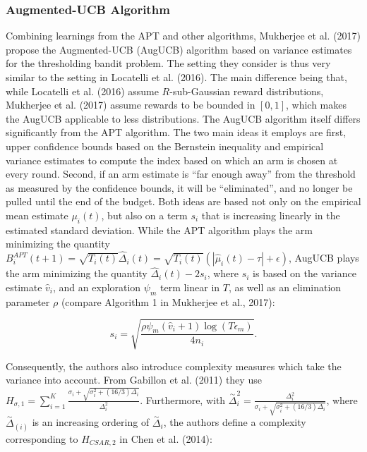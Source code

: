 \documentclass[11pt,]{article}
\begin{document}
\subsubsection{\texorpdfstring{Augmented-UCB Algorithm
\label{sec:AugUCBAlgorithm}}{Augmented-UCB Algorithm }}\label{augmented-ucb-algorithm}

Combining learnings from the APT and other algorithms, Mukherjee et al.
(2017) propose the Augmented-UCB (AugUCB) algorithm based on variance
estimates for the thresholding bandit problem. The setting they consider
is thus very similar to the setting in Locatelli et al. (2016). The main
difference being that, while Locatelli et al. (2016) assume
\(R\)-sub-Gaussian reward distributions, Mukherjee et al. (2017) assume
rewards to be bounded in \([0,1]\), which makes the AugUCB applicable to
less distributions. The AugUCB algorithm itself differs significantly
from the APT algorithm. The two main ideas it employs are first, upper
confidence bounds based on the Bernstein inequality and empirical
variance estimates to compute the index based on which an arm is chosen
at every round. Second, if an arm estimate is ``far enough away'' from
the threshold as measured by the confidence bounds, it will be
``eliminated'', and no longer be pulled until the end of the budget.
Both ideas are based not only on the empirical mean estimate
\(\mu_i(t)\), but also on a term \(s_i\) that is increasing linearly in
the estimated standard deviation. While the APT algorithm plays the arm
minimizing the quantity
\(B_i^{APT}(t+1) = \sqrt{T_i(t)} \hat{\Delta}_i(t) = \sqrt{T_i(t)} (|\hat{\mu}_i(t) - \tau| + \epsilon)\),
AugUCB plays the arm minimizing the quantity
\(\hat{\Delta}_i(t) - 2s_i\), where \(s_i\) is based on the variance
estimate \(\hat{v}_i\), and an exploration \(\psi_m\) term linear in
\(T\), as well as an elimination parameter \(\rho\) (compare Algorithm 1
in Mukherjee et al., 2017):

\begin{equation*}
s_i = \sqrt{\frac{\rho \psi_m (\hat{v}_i + 1) \log(T \epsilon_m)}{4n_i}}.
\end{equation*}

Consequently, the authors also introduce complexity measures which take
the variance into account. From Gabillon et al. (2011) they use
\(H_{\sigma, 1}= \sum_{i=1}^K \frac{\sigma_i + \sqrt{\sigma_i^2 + (16/3)\Delta_i}}{\Delta_i^2}\).
Furthermore, with
\(\stackrel{\sim}{\Delta}_i^2 = \frac{\Delta_i^2}{\sigma_i + \sqrt{\sigma_i^2 + (16/3)\Delta_i}}\),
where \(\stackrel{\sim}{\Delta}_{(i)}\) is an increasing ordering of
\(\stackrel{\sim}{\Delta}_i\), the authors define a complexity
corresponding to \(H_{CSAR,2}\) in Chen et al. (2014):
\end{document}
